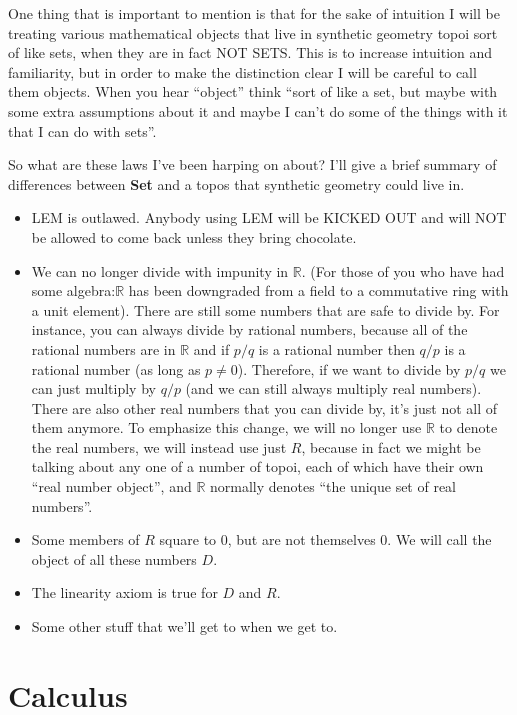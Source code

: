 \documentclass[]{book}
\providecommand{\tightlist}{%
  \setlength{\itemsep}{0pt}\setlength{\parskip}{0pt}}
\begin{document}
One thing that is important to mention is that for the sake of intuition I will be treating various mathematical objects that live in synthetic geometry topoi sort of like sets, when they are in fact NOT SETS. This is to increase intuition and familiarity, but in order to make the distinction clear I will be careful to call them objects. When you hear ``object'' think ``sort of like a set, but maybe with some extra assumptions about it and maybe I can't do some of the things with it that I can do with sets''.

So what are these laws I've been harping on about? I'll give a brief summary of differences between \textbf{Set} and a topos that synthetic geometry could live in.

\begin{itemize}
\tightlist
\item
  LEM is outlawed. Anybody using LEM will be KICKED OUT and will NOT be
  allowed to come back unless they bring chocolate.
\item
  We can no longer divide with impunity in $\mathbb{R}$. (For those of
  you who have had some algebra:$\mathbb{R}$ has been downgraded from
  a field to a commutative ring with a unit element). There are still
  some numbers that are safe to divide by. For instance, you can always
  divide by rational numbers, because all of the rational numbers are in
  $\mathbb{R}$ and if $p/q$ is a rational number then $q/p$ is a
  rational number (as long as $p \neq 0$). Therefore, if we want to
  divide by $p/q$ we can just multiply by $q/p$ (and we can still
  always multiply real numbers). There are also other real numbers that
  you can divide by, it's just not all of them anymore. To emphasize
  this change, we will no longer use $\mathbb{R}$ to denote the real
  numbers, we will instead use just $R$, because in fact we might be
  talking about any one of a number of topoi, each of which have their
  own ``real number object'', and $\mathbb{R}$ normally denotes ``the
  unique set of real numbers''.
\item
  Some members of $R$ square to 0, but are not themselves 0. We will
  call the object of all these numbers $D$.
\item
  The linearity axiom is true for $D$ and $R$.
\item
  Some other stuff that we'll get to when we get to.
\end{itemize}

\hypertarget{calculus}{%
\chapter{Calculus}\label{calculus}}
\end{document}
